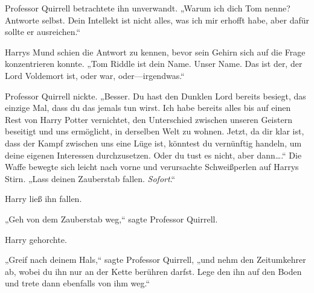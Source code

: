 Professor Quirrell betrachtete ihn unverwandt.
„Warum ich dich Tom nenne? Antworte selbst. Dein Intellekt ist nicht alles, was ich mir erhofft habe, aber dafür sollte er ausreichen.“

Harrys Mund schien die Antwort zu kennen, bevor sein Gehirn sich auf die Frage konzentrieren konnte.
„Tom Riddle ist dein Name. Unser Name. Das ist der, der Lord Voldemort ist, oder war, oder—irgendwas.“

Professor Quirrell nickte.
„Besser. Du hast den Dunklen Lord bereits besiegt, das einzige Mal, dass du das jemals tun wirst. Ich habe bereits alles bis auf einen Rest von Harry Potter vernichtet, den Unterschied zwischen unseren Geistern beseitigt und uns ermöglicht, in derselben Welt zu wohnen. Jetzt, da dir klar ist, dass der Kampf zwischen uns eine Lüge ist, könntest du vernünftig handeln, um deine eigenen Interessen durchzusetzen. Oder du tust es nicht, aber dann….“
Die Waffe bewegte sich leicht nach vorne und verursachte Schweißperlen auf Harrys Stirn.
„Lass deinen Zauberstab fallen. \emph{Sofort}.“

Harry ließ ihn fallen.

„Geh von dem Zauberstab weg,“ sagte Professor Quirrell.

Harry gehorchte.

„Greif nach deinem Hals,“ sagte Professor Quirrell, „und nehm den Zeitumkehrer ab, wobei du ihn nur an der Kette berühren darfst. Lege den ihn auf den Boden und trete dann ebenfalls von ihm weg.“

